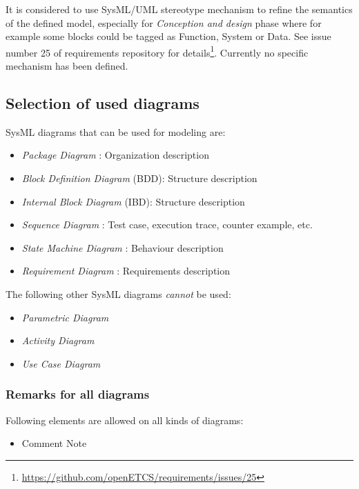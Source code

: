 It is considered to use SysML/UML stereotype mechanism to refine the
semantics of the defined model, especially for \emph{Conception and
  design} phase where for example some blocks could be tagged as
Function, System or Data. See issue number 25 of requirements
repository for
details\footnote{\url{https://github.com/openETCS/requirements/issues/25}}.
Currently no specific mechanism has been defined.

\subsection{Selection of used diagrams}

SysML diagrams that can be used for modeling are:
\begin{itemize}
\item \emph{Package Diagram}   : Organization description
\item \emph{Block Definition Diagram}  (BDD): Structure description
\item \emph{Internal Block Diagram}  (IBD): Structure description
\item \emph{Sequence Diagram}  : Test case, execution trace, counter
  example, etc.
\item \emph{State Machine Diagram}  : Behaviour description
\item \emph{Requirement Diagram}  : Requirements description
\end{itemize}

The following other SysML diagrams \emph{cannot} be used:
\begin{itemize}
\item \emph{Parametric Diagram}
\item \emph{Activity Diagram}
\item \emph{Use Case Diagram}
\end{itemize}

\subsubsection{Remarks for all diagrams}

Following elements are allowed on all kinds of diagrams:
\begin{itemize}
\item Comment Note
\end{itemize}

